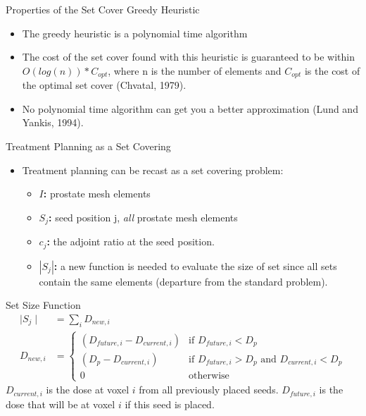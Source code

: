 \documentclass{beamer}
\begin{document}
\begin{frame}{Properties of the Set Cover Greedy Heuristic}

  \begin{itemize}
    \item The greedy heuristic is a polynomial time algorithm
      \medskip
    \item The cost of the set cover found with this heuristic is guaranteed to
      be within $O(log(n))*C_{opt}$, where n is the number of elements and
      $C_{opt}$ is the cost of the optimal set cover (Chvatal, 1979).
      \medskip
    \item No polynomial time algorithm can get you a better approximation
      (Lund and Yankis, 1994).
  \end{itemize}

\end{frame}

\begin{frame}{Treatment Planning as a Set Covering}

  \begin{itemize}
    \item Treatment planning can be recast as a set covering problem:
      \medskip
      \begin{itemize}
        \item \textbf{$I$:} prostate mesh elements
        \item \textbf{${S_j}$:} seed position j, \textit{all} prostate mesh
          elements
        \item \textbf{$c_j$:} the adjoint ratio at the seed position.
        \item \textbf{$|S_j|$:} a new function is needed to evaluate the size 
          of set since all sets contain the same elements (departure from the 
          standard problem).
      \end{itemize}
  \end{itemize}

  \medskip

  \begin{beamerboxesrounded}[upper=boxheadcolor,lower=boxbodycolor,shadow=true]
    {Set Size Function}
    \begin{align}
      \mid S_j \mid & = \sum_{i}D_{new,i} \nonumber \\
      D_{new,i} & = 
      \begin{cases}
        (D_{future,i}-D_{current,i}) & \text{if } D_{future,i} < D_p \\
        (D_p - D_{current,i}) & \text{if } D_{future,i} > D_p \text{ and }
        D_{current,i} < D_p \\
        0 & \text{otherwise}
      \end{cases} \nonumber
    \end{align}
    $D_{current,i}$ is the dose at voxel $i$ from all previously placed seeds. 
    $D_{future,i}$ is the dose that will be at voxel $i$ if this seed is placed.
  \end{beamerboxesrounded}
  
\end{frame}
\end{document}

